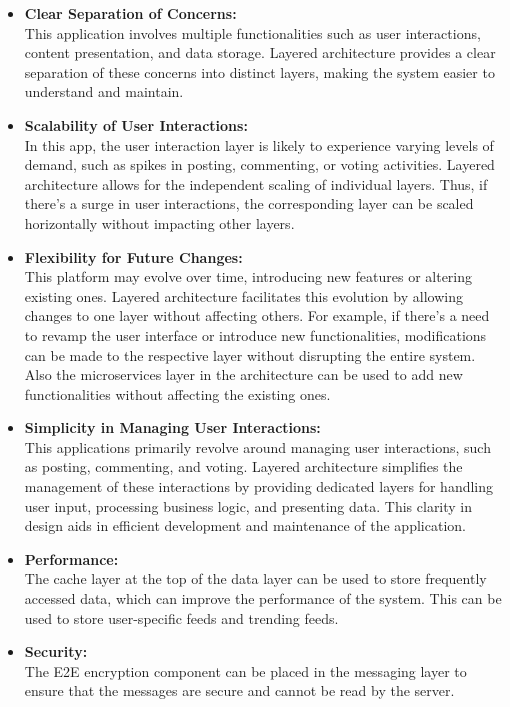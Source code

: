 \documentclass[11pt]{article}
\begin{document}
\begin{itemize}
    \item \textbf{Clear Separation of Concerns:}\\
          This application involves multiple functionalities such as user interactions, content presentation, and data storage. Layered architecture provides a clear separation of these concerns into distinct layers, making the system easier to understand and maintain.
    \item \textbf{Scalability of User Interactions:}\\
          In this app, the user interaction layer is likely to experience varying levels of demand, such as spikes in posting, commenting, or voting activities. Layered architecture allows for the independent scaling of individual layers. Thus, if there's a surge in user interactions, the corresponding layer can be scaled horizontally without impacting other layers.
    \item \textbf{Flexibility for Future Changes:}\\
          This platform may evolve over time, introducing new features or altering existing ones. Layered architecture facilitates this evolution by allowing changes to one layer without affecting others. For example, if there's a need to revamp the user interface or introduce new functionalities, modifications can be made to the respective layer without disrupting the entire system. Also the microservices layer in the architecture can be used to add new functionalities without affecting the existing ones.
    \item \textbf{Simplicity in Managing User Interactions:}\\
          This applications primarily revolve around managing user interactions, such as posting, commenting, and voting. Layered architecture simplifies the management of these interactions by providing dedicated layers for handling user input, processing business logic, and presenting data. This clarity in design aids in efficient development and maintenance of the application.
    \item \textbf{Performance:}\\
          The cache layer at the top of the data layer can be used to store frequently accessed data, which can improve the performance of the system. This can be used to store user-specific feeds and trending feeds.
    \item \textbf{Security:}\\
          The E2E encryption component can be placed in the messaging layer to ensure that the messages are secure and cannot be read by the server.

\end{itemize}
\end{document}
